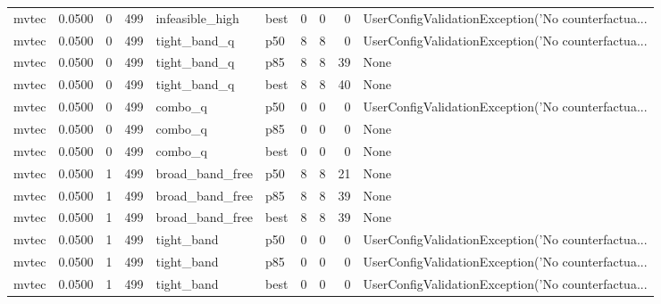 \begin{tabular}{lrrrllrrrl}
   mvtec &    0.0500 &    0 &    499 &      infeasible\_high &   best &               0 &          0 &       0 & UserConfigValidationException('No counterfactua... \\
   mvtec &    0.0500 &    0 &    499 &         tight\_band\_q &    p50 &               8 &          8 &       0 & UserConfigValidationException('No counterfactua... \\
   mvtec &    0.0500 &    0 &    499 &         tight\_band\_q &    p85 &               8 &          8 &      39 &                                               None \\
   mvtec &    0.0500 &    0 &    499 &         tight\_band\_q &   best &               8 &          8 &      40 &                                               None \\
   mvtec &    0.0500 &    0 &    499 &              combo\_q &    p50 &               0 &          0 &       0 & UserConfigValidationException('No counterfactua... \\
   mvtec &    0.0500 &    0 &    499 &              combo\_q &    p85 &               0 &          0 &       0 &                                               None \\
   mvtec &    0.0500 &    0 &    499 &              combo\_q &   best &               0 &          0 &       0 &                                               None \\
   mvtec &    0.0500 &    1 &    499 &      broad\_band\_free &    p50 &               8 &          8 &      21 &                                               None \\
   mvtec &    0.0500 &    1 &    499 &      broad\_band\_free &    p85 &               8 &          8 &      39 &                                               None \\
   mvtec &    0.0500 &    1 &    499 &      broad\_band\_free &   best &               8 &          8 &      39 &                                               None \\
   mvtec &    0.0500 &    1 &    499 &           tight\_band &    p50 &               0 &          0 &       0 & UserConfigValidationException('No counterfactua... \\
   mvtec &    0.0500 &    1 &    499 &           tight\_band &    p85 &               0 &          0 &       0 & UserConfigValidationException('No counterfactua... \\
   mvtec &    0.0500 &    1 &    499 &           tight\_band &   best &               0 &          0 &       0 & UserConfigValidationException('No counterfactua... \\

\end{tabular}
